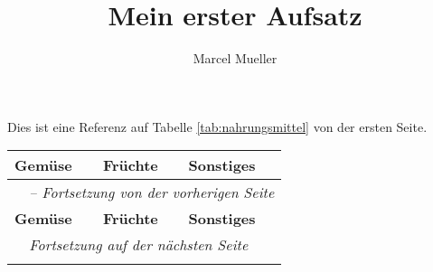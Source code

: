 \documentclass[12pt,a5paper,final]{article}
\author{Marcel Mueller}
\title{Mein erster Aufsatz}
\begin{document}
Dies ist eine Referenz auf Tabelle \ref{tab:nahrungsmittel} von der ersten Seite. 
\begin{longtable}{|l|l|l|}
	\hline	
	\textbf{Gemüse} & \textbf{Früchte}   & \textbf{Sonstiges} \\
	\endfirsthead
	
	\multicolumn{3}{l}{
		\textit{\tablename\ \thetable\  -- \textit{Fortsetzung von der vorherigen Seite}}} \\
	\hline	
	\textbf{Gemüse} & \textbf{Früchte}   & \textbf{Sonstiges} \\
	\endhead

	\multicolumn{3}{l}{
		\textit{\tablename\ \thetable\ Fortsetzung auf der nächsten Seite}} \\
	\endfoot
	
	\endlastfoot


\end{longtable}
\end{document}
